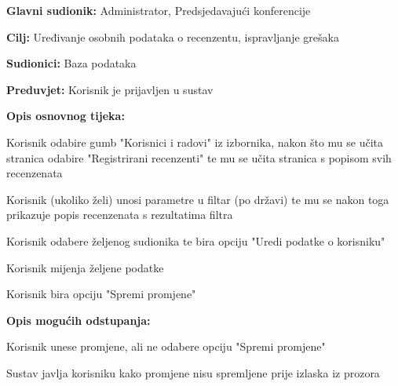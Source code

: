 					\noindent {}
					\begin{packed_item}
						\item \textbf{Glavni sudionik:} Administrator, Predsjedavajući konferencije
						\item \textbf{Cilj:} Uređivanje osobnih podataka o recenzentu, ispravljanje grešaka
						\item \textbf{Sudionici:} Baza podataka
						\item \textbf{Preduvjet:} Korisnik je prijavljen u sustav
						
						\item \textbf{Opis osnovnog tijeka:} 
						\item[] \begin{packed_enum}
							\item Korisnik odabire gumb "Korisnici i radovi" iz izbornika, nakon što mu se učita stranica odabire "Registrirani recenzenti" te mu se učita stranica s popisom svih recenzenata
							\item Korisnik (ukoliko želi) unosi parametre u filtar (po državi) te mu se nakon toga prikazuje popis recenzenata s rezultatima filtra
							\item Korisnik odabere željenog sudionika te bira opciju "Uredi podatke o korisniku"
							\item Korisnik mijenja željene podatke
							\item Korisnik bira opciju "Spremi promjene"
						\end{packed_enum}
					
						\item \textbf{Opis mogućih odstupanja:}
						\item[] \begin{packed_enum}

							\item[4.a] Korisnik unese promjene, ali ne odabere opciju "Spremi promjene"
							\item[] \begin{packed_enum}
								\item[1.] Sustav javlja korisniku kako promjene nisu spremljene prije izlaska iz prozora
							\end{packed_enum}
						\end{packed_enum}
					\end{packed_item}

